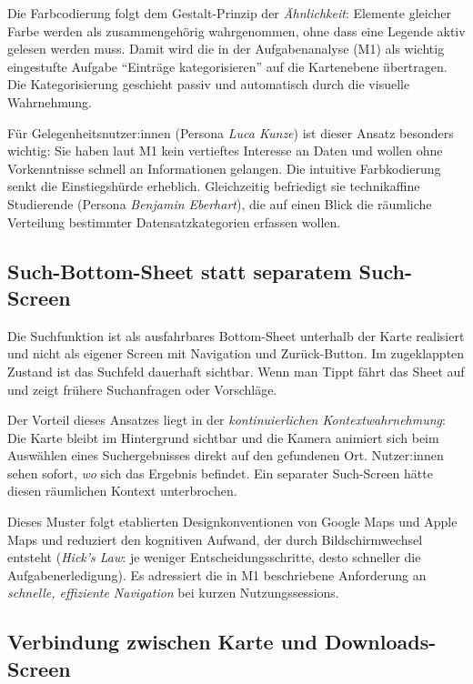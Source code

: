 Die Farbcodierung folgt dem Gestalt-Prinzip der \textit{Ähnlichkeit}:
Elemente gleicher Farbe werden als zusammengehörig wahrgenommen, ohne dass eine Legende aktiv gelesen werden muss.
Damit wird die in der Aufgabenanalyse (M1) als wichtig eingestufte Aufgabe \enquote{Einträge kategorisieren} auf die
Kartenebene übertragen. Die Kategorisierung geschieht passiv und automatisch durch die visuelle Wahrnehmung.

Für Gelegenheitsnutzer:innen (Persona \textit{Luca Kunze}) ist dieser Ansatz besonders wichtig:
Sie haben laut M1 kein vertieftes Interesse an Daten und wollen ohne Vorkenntnisse schnell an Informationen gelangen.
Die intuitive Farbkodierung senkt die Einstiegshürde erheblich.
Gleichzeitig befriedigt sie technikaffine Studierende (Persona \textit{Benjamin Eberhart}),
die auf einen Blick die räumliche Verteilung bestimmter Datensatzkategorien erfassen wollen.

\subsection{Such-Bottom-Sheet statt separatem Such-Screen}

Die Suchfunktion ist als ausfahrbares Bottom-Sheet unterhalb der Karte realisiert und nicht als eigener Screen mit
Navigation und Zurück-Button.
Im zugeklappten Zustand ist das Suchfeld dauerhaft sichtbar. Wenn man Tippt fährt das Sheet auf und zeigt
frühere Suchanfragen oder Vorschläge.

Der Vorteil dieses Ansatzes liegt in der \textit{kontinuierlichen Kontextwahrnehmung}:
Die Karte bleibt im Hintergrund sichtbar und die Kamera animiert sich beim Auswählen eines Suchergebnisses direkt
auf den gefundenen Ort. Nutzer:innen sehen sofort, \textit{wo} sich das Ergebnis befindet.
Ein separater Such-Screen hätte diesen räumlichen Kontext unterbrochen.

Dieses Muster folgt etablierten Designkonventionen von Google Maps und Apple Maps und reduziert den kognitiven Aufwand,
der durch Bildschirmwechsel entsteht (\textit{Hick's Law}: je weniger Entscheidungsschritte,
desto schneller die Aufgabenerledigung).
Es adressiert die in M1 beschriebene Anforderung an \textit{schnelle, effiziente Navigation} bei kurzen Nutzungssessions.

\subsection{Verbindung zwischen Karte und Downloads-Screen}

